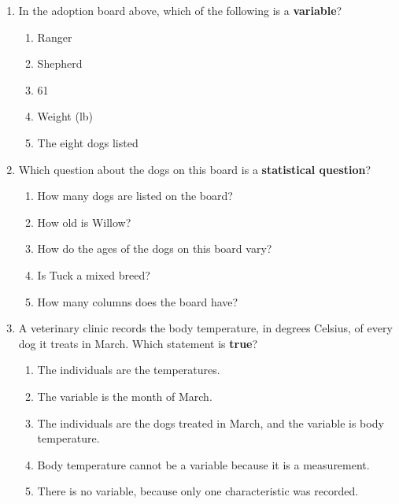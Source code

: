 \documentclass[10pt]{article}
\begin{document}
\vspace{0.10in}

\begin{enumerate}[leftmargin=1.9em, itemsep=0.14in]

  \item In the adoption board above, which of the following is a \textbf{variable}?
        \begin{enumerate}[label=\textbf{(\Alph*)}, leftmargin=2.2em, itemsep=3pt]
          \item Ranger
          \item Shepherd
          \item 61
          \item Weight (lb)
          \item The eight dogs listed
                \hfill{}
        \end{enumerate}

  \item Which question about the dogs on this board is a \textbf{statistical question}?
        \begin{enumerate}[label=\textbf{(\Alph*)}, leftmargin=2.2em, itemsep=3pt]
          \item How many dogs are listed on the board?
          \item How old is Willow?
          \item How do the ages of the dogs on this board vary?
          \item Is Tuck a mixed breed?
          \item How many columns does the board have?
                \hfill{}
        \end{enumerate}

  \boxguard[10]
  \item A veterinary clinic records the body temperature, in degrees Celsius, of every dog it
        treats in March. Which statement is \textbf{true}?
        \begin{enumerate}[label=\textbf{(\Alph*)}, leftmargin=2.2em, itemsep=3pt]
          \item The individuals are the temperatures.
          \item The variable is the month of March.
          \item The individuals are the dogs treated in March, and the variable is body temperature.
          \item Body temperature cannot be a variable because it is a measurement.
          \item There is no variable, because only one characteristic was recorded.
                \hfill{}
        \end{enumerate}


\end{enumerate}
\end{document}
